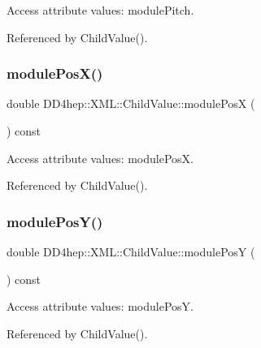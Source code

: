 Access attribute values\+: module\+Pitch. 



Referenced by Child\+Value().

\hypertarget{struct_d_d4hep_1_1_x_m_l_1_1_child_value_a43ac24a1b5435ce33cdbed08d4069a4f}{}\label{struct_d_d4hep_1_1_x_m_l_1_1_child_value_a43ac24a1b5435ce33cdbed08d4069a4f} 
\subsubsection{\texorpdfstring{module\+Pos\+X()}{modulePosX()}}
{\footnotesize\ttfamily double D\+D4hep\+::\+X\+M\+L\+::\+Child\+Value\+::module\+PosX (\begin{DoxyParamCaption}{ }\end{DoxyParamCaption}) const}



Access attribute values\+: module\+PosX. 



Referenced by Child\+Value().

\hypertarget{struct_d_d4hep_1_1_x_m_l_1_1_child_value_add07af0e51b3c0a48ee336ea59d7e4b1}{}\label{struct_d_d4hep_1_1_x_m_l_1_1_child_value_add07af0e51b3c0a48ee336ea59d7e4b1} 
\subsubsection{\texorpdfstring{module\+Pos\+Y()}{modulePosY()}}
{\footnotesize\ttfamily double D\+D4hep\+::\+X\+M\+L\+::\+Child\+Value\+::module\+PosY (\begin{DoxyParamCaption}{ }\end{DoxyParamCaption}) const}



Access attribute values\+: module\+PosY. 



Referenced by Child\+Value().

\hypertarget{struct_d_d4hep_1_1_x_m_l_1_1_child_value_a5c4a413855fb7af65690083aa5d670b8}{}\label{struct_d_d4hep_1_1_x_m_l_1_1_child_value_a5c4a413855fb7af65690083aa5d670b8} 
